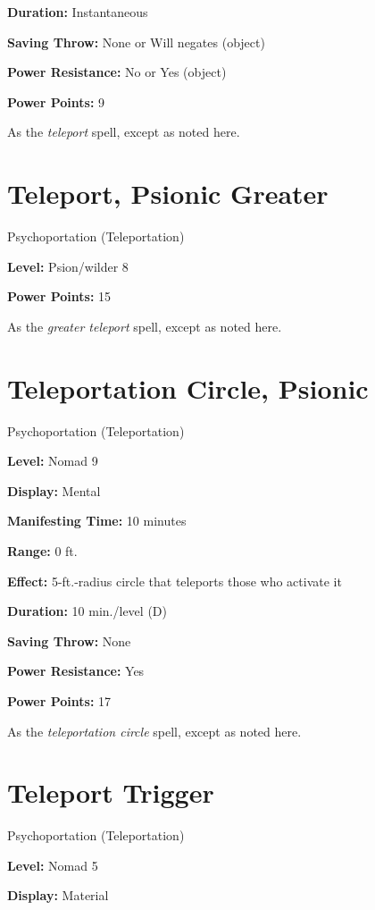 \documentclass{article}
\begin{document}
\textbf{Duration:} Instantaneous

\textbf{Saving Throw:} None or Will negates (object)

\textbf{Power Resistance:} No or Yes (object)

\textbf{Power Points:} 9

As the \textit{teleport }spell, except as noted here.

\vspace{12pt}
\section*{Teleport, Psionic Greater}

Psychoportation (Teleportation)

\textbf{Level:} Psion/wilder 8

\textbf{Power Points:} 15

As the \textit{greater teleport }spell, except as noted here.

\vspace{12pt}
\section*{Teleportation Circle, Psionic}

Psychoportation (Teleportation)

\textbf{Level:} Nomad 9

\textbf{Display:} Mental

\textbf{Manifesting Time:} 10 minutes

\textbf{Range:} 0 ft.

\textbf{Effect:} 5-ft.-radius circle that teleports those who activate it

\textbf{Duration:} 10 min./level (D)

\textbf{Saving Throw:} None

\textbf{Power Resistance:} Yes

\textbf{Power Points:} 17

As the \textit{teleportation circle }spell, except as noted here.

\vspace{12pt}
\section*{Teleport Trigger}

Psychoportation (Teleportation)

\textbf{Level:} Nomad 5

\textbf{Display:} Material
\end{document}
